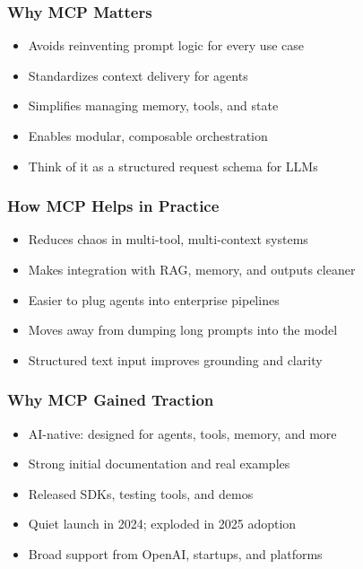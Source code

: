 \begin{frame}[fragile]\frametitle{Why MCP Matters}
      \begin{itemize}
        \item Avoids reinventing prompt logic for every use case
        \item Standardizes context delivery for agents
        \item Simplifies managing memory, tools, and state
        \item Enables modular, composable orchestration
        \item Think of it as a structured request schema for LLMs
      \end{itemize}
\end{frame}

\begin{frame}[fragile]\frametitle{How MCP Helps in Practice}
      \begin{itemize}
        \item Reduces chaos in multi-tool, multi-context systems
        \item Makes integration with RAG, memory, and outputs cleaner
        \item Easier to plug agents into enterprise pipelines
        \item Moves away from dumping long prompts into the model
        \item Structured text input improves grounding and clarity
      \end{itemize}
\end{frame}

\begin{frame}[fragile]\frametitle{Why MCP Gained Traction}
      \begin{itemize}
        \item AI-native: designed for agents, tools, memory, and more
        \item Strong initial documentation and real examples
        \item Released SDKs, testing tools, and demos
        \item Quiet launch in 2024; exploded in 2025 adoption
        \item Broad support from OpenAI, startups, and platforms
      \end{itemize}
\end{frame}

